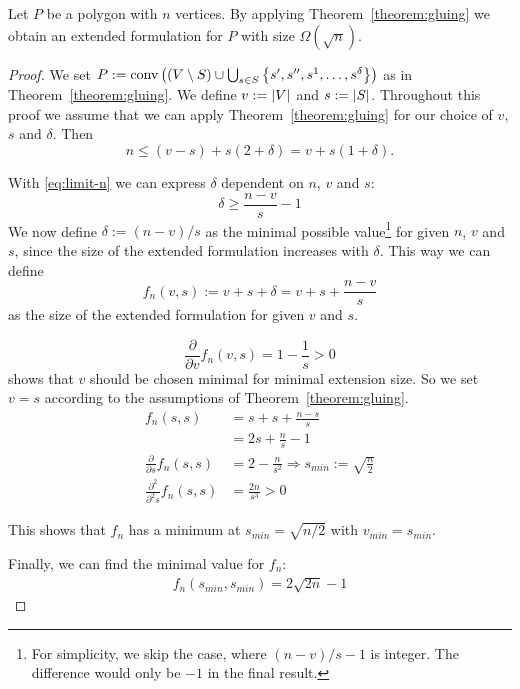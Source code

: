 \begin{observation}\label{observation:limits-of-gluing}
  Let $P$ be a polygon with $n$ vertices. By applying Theorem~\ref{theorem:gluing} we obtain an extended formulation for $P$ with size $\Omega(\sqrt{n})$.
\end{observation}
\begin{proof}
  We set $P := \operatorname{conv}\left( (V \setminus S) \cup \bigcup_{s \in S} \left\{ s',s'',s^1,\dots,s^\delta \right\} \right)$ as in Theorem~\ref{theorem:gluing}. We define $v := \lvert V\rvert$ and $s := \lvert S\rvert$. Throughout this proof we assume that we can apply Theorem~\ref{theorem:gluing} for our choice of $v$, $s$ and $\delta$. Then
  \begin{equation}\label{eq:limit-n}
    n \leq (v-s) + s(2+\delta) = v + s(1+\delta).
  \end{equation}

  With \eqref{eq:limit-n} we can express $\delta$ dependent on $n$, $v$ and $s$:
  \begin{equation*}
    \delta \geq \frac{n-v}{s} - 1
  \end{equation*}
  We now define $\delta := (n-v)/s$ as the minimal possible value\footnote{For simplicity, we skip the case, where $(n-v)/s - 1$ is integer. The difference would only be $-1$ in the final result.} for given $n$, $v$ and $s$, since the size of the extended formulation increases with $\delta$. This way we can define $$f_n(v,s) := v + s + \delta = v + s + \frac{n-v}{s}$$ as the size of the extended formulation for given $v$ and $s$.

  $$\frac{\partial}{\partial v} f_n(v,s) = 1 - \frac{1}{s} > 0$$ shows that $v$ should be chosen minimal for minimal extension size. So we set $v = s$ according to the assumptions of Theorem~\ref{theorem:gluing}.
  \begin{align*}
    f_n(s, s)                                & = s + s + \frac{n-s}{s}                                       \\
                                             & = 2s + \frac{n}{s} - 1                                        \\
    \frac{\partial}{\partial s} f_n(s,s)     & = 2 - \frac{n}{s^2} \Rightarrow s_{min} := \sqrt{\frac{n}{2}} \\
    \frac{\partial^2}{\partial^2 s} f_n(s,s) & = \frac{2n}{s^3} > 0
  \end{align*}

  This shows that $f_n$ has a minimum at $s_{min} = \sqrt{n/2}$ with $v_{min}=s_{min}$.

  Finally, we can find the minimal value for $f_n$:
  \begin{align*}
    f_n(s_{min}, s_{min}) = 2\sqrt{2n} - 1
  \end{align*}
\end{proof}



